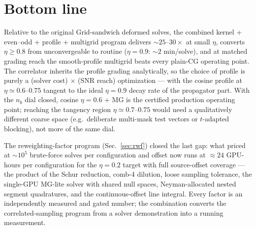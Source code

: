 \documentclass[11pt]{article}
\begin{document}
\section{Bottom line}
Relative to the original Grid-sandwich deformed solves, the combined
kernel + even--odd + profile + multigrid program delivers
$\sim25$--$30\times$ at small $\eta$, converts $\eta\geq0.8$ from
unconvergeable to routine ($\eta=0.9$: $\sim2$ min/solve), and at matched
grading reach the smooth-profile multigrid beats every plain-CG operating
point.  The correlator inherits the profile grading analytically, so the
choice of profile is purely a (solver cost) $\times$ (SNR reach)
optimization --- with the cosine profile at $\eta\simeq0.6$--$0.75$
tangent to the ideal $\eta=0.9$ decay rate of the propagator part.  With
the $n_b$ dial closed, cosine $\eta=0.6$ + MG is the certified
production operating point; reaching the tangency region
$\eta\simeq0.7$--$0.75$ would need a qualitatively different coarse
space (e.g.\ deliberate multi-mask test vectors or $t$-adapted blocking),
not more of the same dial.

The reweighting-factor program (Sec.~\ref{sec:rwf}) closed the last
gap: what priced at $\sim\!10^5$ brute-force solves per configuration
and offset now runs at $\approx 24$ GPU-hours per configuration for the
$\eta = 0.2$ target with full source-offset coverage --- the product of
the Schur reduction, comb-4 dilution, loose sampling tolerance, the
single-GPU MG-lite solver with shared null spaces, Neyman-allocated
nested segment quadratures, and the continuous-offset line integral.
Every factor is an independently measured and gated number; the
combination converts the correlated-sampling program from a solver
demonstration into a running measurement.
\end{document}
